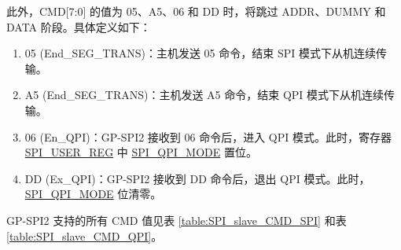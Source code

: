 \documentclass[main\_\_CN.tex]{subfiles}
\begin{document}
此外，CMD[7:0] 的值为 \hexprefix{}05、\hexprefix{}A5、\hexprefix{}06 和 \hexprefix{}DD 时，将跳过 ADDR、DUMMY 和 DATA 阶段。具体定义如下：

\begin{enumerate}
    \item \hexprefix{}05 (End\_SEG\_TRANS)：主机发送 \hexprefix{}05 命令，结束 SPI 模式下从机连续传输。
    \item \hexprefix{}A5 (End\_SEG\_TRANS)：主机发送 \hexprefix{}A5 命令，结束 QPI 模式下从机连续传输。
    \item \hexprefix{}06 (En\_QPI)：GP-SPI2 接收到 \hexprefix{}06 命令后，进入 QPI 模式。此时，寄存器 \hyperref[regdesc:SPIUSERREG]{SPI\_USER\_REG} 中 \hyperref[fielddesc:SPIQPIMODE]{SPI\_QPI\_MODE} 置位。
    \item \hexprefix{}DD (Ex\_QPI)：GP-SPI2 接收到 \hexprefix{}DD 命令后，退出 QPI 模式。此时，\hyperref[fielddesc:SPIQPIMODE]{SPI\_QPI\_MODE} 位清零。
\end{enumerate}


GP-SPI2 支持的所有 CMD 值见表  \ref{table:SPI_slave_CMD_SPI} 和表  \ref{table:SPI_slave_CMD_QPI}。
\end{document}
